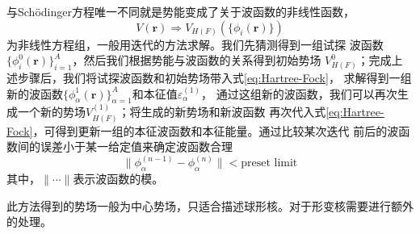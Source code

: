 与Sch{\"o}dinger方程唯一不同就是势能变成了关于波函数的非线性函数，
\begin{equation*} V(\bm{r}) \Longrightarrow V_{H(F)}(\{\phi_{i}(\bm{r})\})
\end{equation*}
为非线性方程组，一般用迭代的方法求解。我们先猜测得到一组试探
波函数$\{\phi_i^0(\bm{r})\}_{i=1}^{A}$，然后我们根据势能与波函数的关系得到初始势场
$V_{H(F)}^{0}$；完成上述步骤后，我们将试探波函数和初始势场带入式\eqref{eq:Hartree-Fock}，
求解得到一组新的波函数$\{\phi_{\alpha}^1(\bm{r})\}_{\alpha=1}^{A}$和本征值$\varepsilon_{\alpha}^{(1)}$，
通过这组新的波函数，我们可以再次生成一个新的势场$V_{H(F)}^{(1)}$；将生成的新势场和新波函数
再次代入式\eqref{eq:Hartree-Fock}，可得到更新一组的本征波函数和本征能量。通过比较某次迭代
前后的波函数间的误差小于某一给定值来确定波函数合理
\begin{equation}
    \parallel \phi_{\alpha}^{(n-1)} - \phi_{\alpha}^{(n)} \parallel < \text{preset limit}
    \label{eq:iter-error}
\end{equation}
其中，$\parallel \cdots \parallel$表示波函数的模。

此方法得到的势场一般为中心势场，只适合描述球形核。对于形变核需要进行额外的处理。

